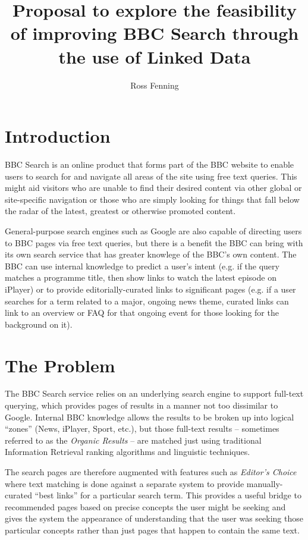 \documentclass[10pt,a4paper]{article}
\title{Proposal to explore the feasibility of improving BBC Search through the use of Linked Data}
\author{Ross Fenning}
\begin{document}
\maketitle
\thispagestyle{empty}

\section{Introduction}

BBC Search is an online product that forms part of the BBC website
to enable users to search for and navigate all areas of the site using
free text queries. This might aid visitors who are unable to find their desired
content via other global or site-specific navigation or those who are simply
looking for things that fall below the radar of the latest, greatest or
otherwise promoted content.

General-purpose search engines such as Google are also capable of directing
users to BBC pages via free text queries, but there is a benefit the BBC
can bring with its own search service that has greater knowlege of the
BBC's own content. The BBC can use internal knowledge to predict a user's
intent (e.g. if the query matches a programme title, then show links to watch
the latest episode on iPlayer) or to provide editorially-curated
links to significant pages (e.g. if a user searches for a term
related to a major, ongoing news theme, curated links can
link to an overview or FAQ for that ongoing event for those
looking for the background on it).

\section{The Problem}

The BBC Search service relies on an underlying search engine to support
full-text querying, which provides pages of results in a manner not
too dissimilar to Google. Internal BBC knowledge allows the results
to be broken up into logical ``zones'' (News, iPlayer, Sport, etc.),
but those full-text results
-- sometimes referred to as the \emph{Organic Results} -- are matched
just using traditional Information Retrieval ranking
algorithms and linguistic techniques.

The search pages are therefore augmented with features such as
\emph{Editor's Choice} where text matching is done against a separate
system to provide manually-curated ``best links'' for a particular
search term. This provides a useful bridge to recommended pages based
on precise concepts the user might be seeking and gives the system
the appearance of understanding that the user was seeking those
particular concepts rather than just pages that happen to contain
the same text.
\end{document}
